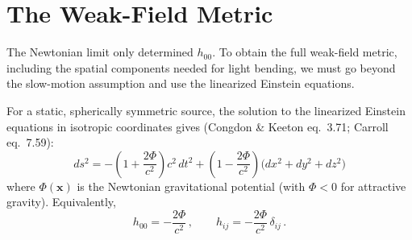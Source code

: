 \section{The Weak-Field Metric}
\label{sec:weak_field_metric}

The Newtonian limit only determined $h_{00}$.  To obtain the full
weak-field metric, including the spatial components needed for
light bending, we must go beyond the slow-motion assumption and
use the linearized Einstein equations.

For a static, spherically symmetric source, the solution to the
linearized Einstein equations in isotropic coordinates gives
(Congdon \& Keeton eq.~3.71; Carroll eq.~7.59):
\begin{equation}
    \boxed{
    ds^2 = -\left(1 + \frac{2\Phi}{c^2}\right) c^2\, dt^2
    + \left(1 - \frac{2\Phi}{c^2}\right)
    \bigl(dx^2 + dy^2 + dz^2\bigr)
    }
    \label{eq:weak_field_metric}
\end{equation}
where $\Phi(\mathbf{x})$ is the Newtonian gravitational potential
(with $\Phi < 0$ for attractive gravity).  Equivalently,
\begin{equation}
    h_{00} = -\frac{2\Phi}{c^2} \,, \qquad
    h_{ij} = -\frac{2\Phi}{c^2}\,\delta_{ij} \,.
    \label{eq:h_components}
\end{equation}

